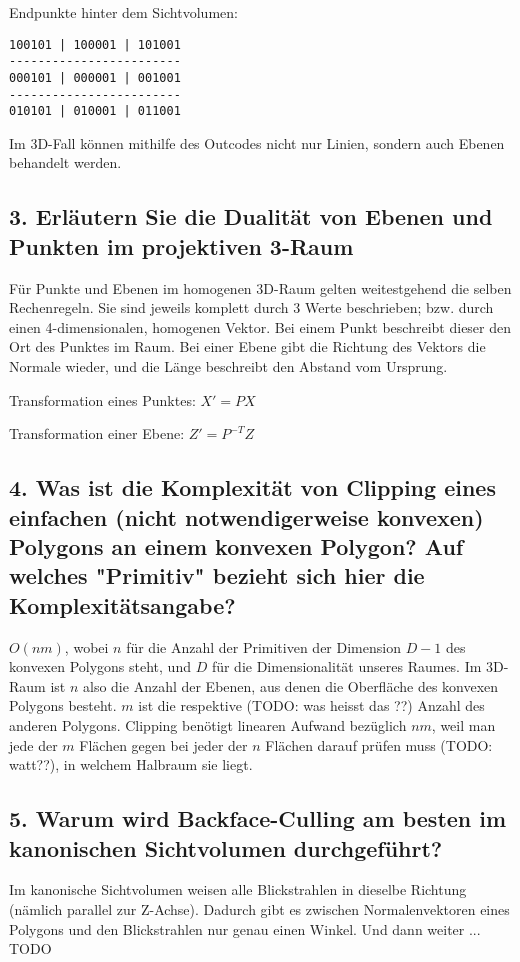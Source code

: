 \documentclass[a4paper,headings=small]{scrartcl}
\numberwithin{equation}{section} %
\numberwithin{figure}{section}   %
\begin{document}
Endpunkte hinter dem Sichtvolumen:
\begin{verbatim}
100101 | 100001 | 101001
------------------------
000101 | 000001 | 001001
------------------------
010101 | 010001 | 011001
\end{verbatim}

Im 3D-Fall können mithilfe des Outcodes nicht nur Linien, sondern auch Ebenen behandelt werden.

\subsection{3. Erläutern Sie die Dualität von Ebenen und Punkten im projektiven 3-Raum}
Für Punkte und Ebenen im homogenen 3D-Raum gelten weitestgehend die selben Rechenregeln. Sie sind jeweils komplett durch 3 Werte beschrieben; bzw. durch einen 4-dimensionalen, homogenen Vektor. Bei einem Punkt beschreibt dieser den Ort des Punktes im Raum. Bei einer Ebene gibt die Richtung des Vektors die Normale wieder, und die Länge beschreibt den Abstand vom Ursprung.

Transformation eines Punktes: $X' = P X$

Transformation einer Ebene: $Z' = P^{-T} Z$

\subsection{4. Was ist die Komplexität von Clipping eines einfachen (nicht notwendigerweise konvexen) Polygons an einem konvexen Polygon? Auf welches "Primitiv" bezieht sich hier die Komplexitätsangabe?}

$O(n m)$, wobei $n$ für die Anzahl der Primitiven der Dimension $D - 1$ des konvexen Polygons steht, und $D$ für die Dimensionalität unseres Raumes. Im 3D-Raum ist $n$ also die Anzahl der Ebenen,  aus denen die Oberfläche des konvexen Polygons besteht. $m$ ist die respektive (TODO: was heisst das ??) Anzahl des anderen Polygons. Clipping benötigt linearen Aufwand bezüglich $n m$, weil man jede der $m$ Flächen gegen bei jeder der $n$ Flächen darauf prüfen muss (TODO: watt??), in welchem Halbraum sie liegt.

\subsection{5. Warum wird Backface-Culling am besten im kanonischen Sichtvolumen durchgeführt?}

Im kanonische Sichtvolumen weisen alle Blickstrahlen in dieselbe Richtung (nämlich parallel zur Z-Achse). Dadurch gibt es zwischen Normalenvektoren eines Polygons und den Blickstrahlen nur genau einen Winkel. Und dann weiter ...
TODO
\end{document}
